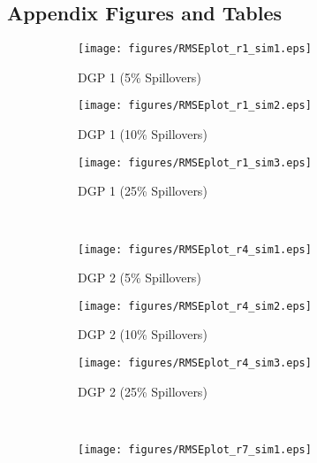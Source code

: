 \documentclass[12pt]{article}
\begin{document}
\begin{spacing}{1.3}
\setcounter{table}{0}
\renewcommand{\thetable}{A\arabic{table}}
\setcounter{figure}{0}
\renewcommand{\thefigure}{A\arabic{figure}}


\appendix
\section*{Appendix Figures and Tables}
\begin{figure}[htpb!]
  \centering
  \begin{subfigure}[b]{0.325\textwidth}
    \centering
    \texttt{[image: figures/RMSEplot\_r1\_sim1.eps]}
    \caption{\small DGP 1 (5\% Spillovers)}\label{fig:DGP1a}
  \end{subfigure}
  \begin{subfigure}[b]{0.325\textwidth}
    \centering
    \texttt{[image: figures/RMSEplot\_r1\_sim2.eps]}
    \caption{\small DGP 1 (10\% Spillovers)}\label{fig:DGP1b}
  \end{subfigure}
  \begin{subfigure}[b]{0.325\textwidth}
    \centering
    \texttt{[image: figures/RMSEplot\_r1\_sim3.eps]}
    \caption{\small DGP 1 (25\% Spillovers)}\label{fig:DGP1c}
  \end{subfigure}
  \vspace{8mm} \\
  \begin{subfigure}[b]{0.325\textwidth}
    \centering
    \texttt{[image: figures/RMSEplot\_r4\_sim1.eps]}
    \caption{\small DGP 2 (5\% Spillovers)}\label{fig:DGP2a}
  \end{subfigure}
  \begin{subfigure}[b]{0.325\textwidth}
    \centering
    \texttt{[image: figures/RMSEplot\_r4\_sim2.eps]}
    \caption{\small DGP 2 (10\% Spillovers)}\label{fig:DGP2b}
  \end{subfigure}
  \begin{subfigure}[b]{0.325\textwidth}
    \centering
    \texttt{[image: figures/RMSEplot\_r4\_sim3.eps]}
    \caption{\small DGP 2 (25\% Spillovers)}\label{fig:DGP2c}
  \end{subfigure}
  \vspace{8mm} \\
  \begin{subfigure}[b]{0.325\textwidth}
    \centering
    \texttt{[image: figures/RMSEplot\_r7\_sim1.eps]}

\end{subfigure}
\end{figure}
\end{spacing}
\end{document}
